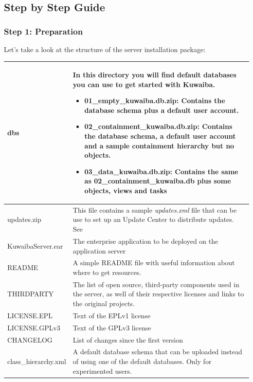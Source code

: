 \documentclass[a4paper]{article}
\begin{document}
		
		\newpage
		\subsection{Step by Step Guide}
		\subsubsection{Step 1: Preparation}
			Let's take a look at the structure of the server installation package:
			
			\begin{table}[h!]
				\begin{tabular}{p{5cm}p{10cm}}
					\toprule
					dbs & 
					In this directory you will find default databases you can use to get started with Kuwaiba.
					\begin{itemize}
						\item \textbf{01\_empty\_kuwaiba.db.zip}: Contains the database schema plus a default user account.
						\item \textbf{02\_containment\_kuwaiba.db.zip}: Contains the database schema, a default user account and a sample containment hierarchy but no objects.
						\item \textbf{03\_data\_kuwaiba.db.zip}: Contains the same as 02\_containment\_kuwaiba.db plus some objects, views and tasks 
						
					\end{itemize} \\
					\midrule
					updates.zip & This file contains a sample \textit{updates.xml} file that can be use to set up an Update Center to distribute updates. See \textbf{\nameref{app:AppendixE}}\\
					\midrule
					KuwaibaServer.ear & The enterprise application to be deployed on the application server \\
					\midrule
					README & A simple README file with useful information about where to get resources. \\
					\midrule
					THIRDPARTY & The list of open source, third-party components used in the server, as well of their respective licenses and links to the original projects. \\
					\midrule
					LICENSE.EPL & Text of the EPLv1 license \\
					\midrule
					LICENSE.GPLv3 & Text of the GPLv3 license \\
					\midrule
					CHANGELOG & List of changes since the first version \\
					\midrule
					class\_hierarchy.xml & A default database schema that can be uploaded instead of using one of the default databases. Only for experimented users. \\
					\bottomrule	
				\end{tabular}
			\end{table}
\end{document}
